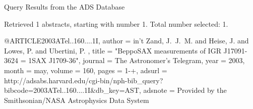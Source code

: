 Query Results from the ADS Database


Retrieved 1 abstracts, starting with number 1.  Total number selected: 1.

@ARTICLE{2003ATel..160....1I,
   author = {{in't Zand}, J.~J.~M. and {Heise}, J. and {Lowes}, P. and {Ubertini}, P.
	},
    title = "{BeppoSAX measurements of IGR J17091-3624 = 1SAX J1709-36}",
  journal = {The Astronomer's Telegram},
     year = 2003,
    month = may,
   volume = 160,
    pages = {1-+},
   adsurl = {http://adsabs.harvard.edu/cgi-bin/nph-bib_query?bibcode=2003ATel..160....1I&db_key=AST},
  adsnote = {Provided by the Smithsonian/NASA Astrophysics Data System}
}


